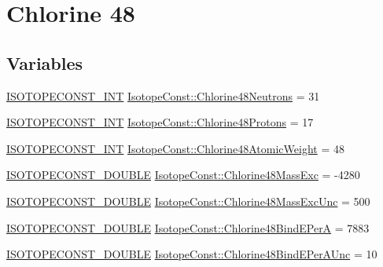 \hypertarget{group___isotope_const-_chlorine-_cl48}{}\section{Chlorine 48}
\label{group___isotope_const-_chlorine-_cl48}
\subsection*{Variables}
\begin{DoxyCompactItemize}
\item 
\mbox{\hyperlink{group___isotope_const-_macros_ga5f18360b3e99483a35c32d789e62621c}{I\+S\+O\+T\+O\+P\+E\+C\+O\+N\+S\+T\+\_\+\+I\+NT}} \mbox{\hyperlink{group___isotope_const-_chlorine-_cl48_ga610d09693ca60f4d1252bad999849c6f}{Isotope\+Const\+::\+Chlorine48\+Neutrons}} = 31
\item 
\mbox{\hyperlink{group___isotope_const-_macros_ga5f18360b3e99483a35c32d789e62621c}{I\+S\+O\+T\+O\+P\+E\+C\+O\+N\+S\+T\+\_\+\+I\+NT}} \mbox{\hyperlink{group___isotope_const-_chlorine-_cl48_gaf8f77d44f4329e56123156597aa06578}{Isotope\+Const\+::\+Chlorine48\+Protons}} = 17
\item 
\mbox{\hyperlink{group___isotope_const-_macros_ga5f18360b3e99483a35c32d789e62621c}{I\+S\+O\+T\+O\+P\+E\+C\+O\+N\+S\+T\+\_\+\+I\+NT}} \mbox{\hyperlink{group___isotope_const-_chlorine-_cl48_ga0b38055d3bc76e1c7fcf677ebbc9a3db}{Isotope\+Const\+::\+Chlorine48\+Atomic\+Weight}} = 48
\item 
\mbox{\hyperlink{group___isotope_const-_macros_ga8f45a7272ce02c0b4c65c44636ed719a}{I\+S\+O\+T\+O\+P\+E\+C\+O\+N\+S\+T\+\_\+\+D\+O\+U\+B\+LE}} \mbox{\hyperlink{group___isotope_const-_chlorine-_cl48_gab36fe6087889e0ae6820d8c0ca6ce352}{Isotope\+Const\+::\+Chlorine48\+Mass\+Exc}} = -\/4280
\item 
\mbox{\hyperlink{group___isotope_const-_macros_ga8f45a7272ce02c0b4c65c44636ed719a}{I\+S\+O\+T\+O\+P\+E\+C\+O\+N\+S\+T\+\_\+\+D\+O\+U\+B\+LE}} \mbox{\hyperlink{group___isotope_const-_chlorine-_cl48_ga9ce600a9fb08e8494c1886373e705005}{Isotope\+Const\+::\+Chlorine48\+Mass\+Exc\+Unc}} = 500
\item 
\mbox{\hyperlink{group___isotope_const-_macros_ga8f45a7272ce02c0b4c65c44636ed719a}{I\+S\+O\+T\+O\+P\+E\+C\+O\+N\+S\+T\+\_\+\+D\+O\+U\+B\+LE}} \mbox{\hyperlink{group___isotope_const-_chlorine-_cl48_ga1ea27805eb7cbbdf48e08c5e4eaab99d}{Isotope\+Const\+::\+Chlorine48\+Bind\+E\+PerA}} = 7883
\item 
\mbox{\hyperlink{group___isotope_const-_macros_ga8f45a7272ce02c0b4c65c44636ed719a}{I\+S\+O\+T\+O\+P\+E\+C\+O\+N\+S\+T\+\_\+\+D\+O\+U\+B\+LE}} \mbox{\hyperlink{group___isotope_const-_chlorine-_cl48_gac12f145bdb97925adc064be0ebf464ff}{Isotope\+Const\+::\+Chlorine48\+Bind\+E\+Per\+A\+Unc}} = 10

\end{DoxyCompactItemize}
